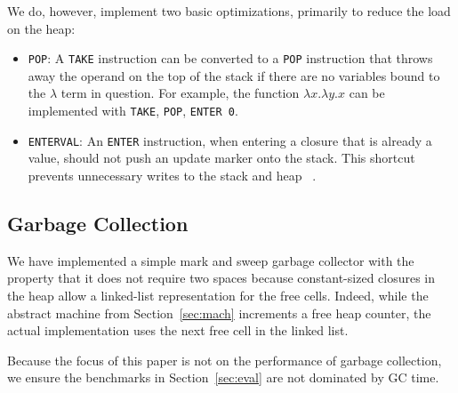 We do, however, implement two basic optimizations, primarily to reduce the load
on the heap:

\begin{itemize}
\item \texttt{POP}: A \texttt{TAKE} instruction can be converted to a \texttt{POP}
instruction that throws away the operand on the top of the stack if there are no
variables bound to the $\lambda$ term in question. For example, the function
$\lambda x.\lambda y.x$ can be implemented with \texttt{TAKE}, \texttt{POP},
\texttt{ENTER 0}.  
\item \texttt{ENTERVAL}: An \texttt{ENTER} instruction, when entering a
closure that is already a value, should not push an update marker onto the
stack. This shortcut prevents unnecessary writes to the stack and heap
~\cite{jonesstg,lkm,sestoft}.  
\end{itemize}

\subsection{Garbage Collection}

We have implemented a simple mark and sweep garbage collector with the property
that it does not require two spaces because constant-sized closures in the
heap allow a linked-list representation for the free cells. Indeed,
while the abstract machine from Section~\ref{sec:mach} increments a free heap
counter, the actual implementation uses the next free cell in the linked list.

Because the focus of this paper is not on the performance of garbage collection,
we ensure the benchmarks in Section~\ref{sec:eval} are not dominated by GC time.

